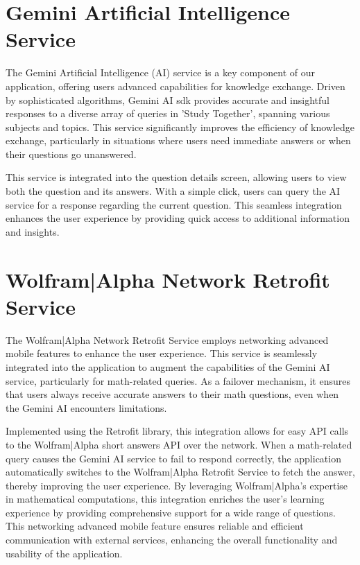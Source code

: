 \section{Gemini Artificial Intelligence Service}

The Gemini Artificial Intelligence (AI) service is a key component of our application, offering users advanced capabilities for knowledge exchange. Driven by sophisticated algorithms, Gemini AI sdk provides accurate and insightful responses to a diverse array of queries in 'Study Together', spanning various subjects and topics. This service significantly improves the efficiency of knowledge exchange, particularly in situations where users need immediate answers or when their questions go unanswered. 

This service is integrated into the question details screen, allowing users to view both the question and its answers. With a simple click, users can query the AI service for a response regarding the current question. This seamless integration enhances the user experience by providing quick access to additional information and insights.

\section{Wolfram|Alpha Network Retrofit Service}

The Wolfram|Alpha Network Retrofit Service employs networking advanced mobile features to enhance the user experience. This service is seamlessly integrated into the application to augment the capabilities of the Gemini AI service, particularly for math-related queries. As a failover mechanism, it ensures that users always receive accurate answers to their math questions, even when the Gemini AI encounters limitations. 

Implemented using the Retrofit library, this integration allows for easy API calls to the Wolfram|Alpha short answers API over the network. When a math-related query causes the Gemini AI service to fail to respond correctly, the application automatically switches to the Wolfram|Alpha Retrofit Service to fetch the answer, thereby improving the user experience. By leveraging Wolfram|Alpha's expertise in mathematical computations, this integration enriches the user's learning experience by providing comprehensive support for a wide range of questions. This networking advanced mobile feature ensures reliable and efficient communication with external services, enhancing the overall functionality and usability of the application.

